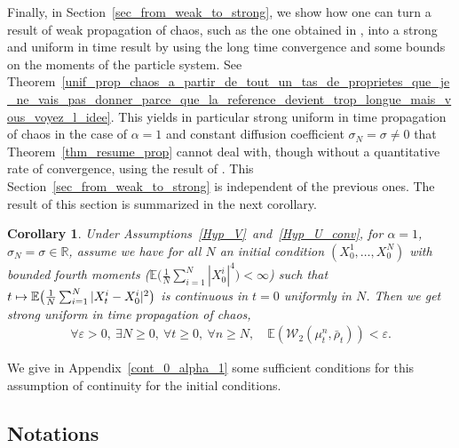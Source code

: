 \documentclass[10pt]{amsart}
\newcommand\mto{\mathchoice{\longmapsto}{\mapsto}{\mapsto}{\mapsto}}
\let\epsilon\varepsilon
\theoremstyle{plain}
\newtheorem{corollary}{Corollary}[section]
\theoremstyle{definition}
\begin{document}
Finally, in Section~\ref{sec_from_weak_to_strong}, we show how one can turn a result of weak propagation of chaos, such as the one obtained in \cite{Rogers_Shi, cepa_lepingle, Li_Li_Xie}, into a strong and uniform in time result by using the long time convergence and some bounds on the moments of the particle system. See Theorem~\ref{unif_prop_chaos_a_partir_de_tout_un_tas_de_proprietes_que_je_ne_vais_pas_donner_parce_que_la_reference_devient_trop_longue_mais_vous_voyez_l_idee}. This yields in particular strong uniform in time propagation of chaos in the case of $\alpha=1$ and constant diffusion coefficient $\sigma_N=\sigma\neq0$ that Theorem~\ref{thm_resume_prop} cannot deal with, though without a quantitative rate of convergence, using the result of \cite{cepa_lepingle}. This Section~\ref{sec_from_weak_to_strong} is independent of the previous ones. The result of this section is summarized in the next corollary.


\begin{corollary}
Under Assumptions~\ref{Hyp_V}~and~\ref{Hyp_U_conv}, for $\alpha=1$, $\sigma_N= \sigma\in\mathbb{R}$, assume we have for all $N$ an initial condition $(X^1_0,\dots,X^N_0)$ with bounded fourth moments (\ie $\mathbb{E}\bigl(\frac{1}{N}\sum_{i=1}^N|X^i_0|^4\bigr)<\infty$) such that ${t\mto\mathbb{E}\bigl(\frac{1}{N}\sum_{i=1}^N|X^i_t-X^i_0|^2\bigr)}$ is continuous in $t=0$ uniformly in $N$. Then we get strong uniform in time propagation of chaos, \ie
\begin{align*}
\forall \epsilon>0,\ \exists N\geq0,\ \forall t\geq0,\ \forall n\geq N,\quad \mathbb{E}\left(\mathcal{W}_2\left(\mu^n_t,\bar{\rho}_t\right)\right)<\epsilon.
\end{align*}
\end{corollary}


We give in Appendix~\ref{cont_0_alpha_1} some sufficient conditions for this assumption of continuity for the initial conditions.

\subsection*{Notations}
\end{document}
